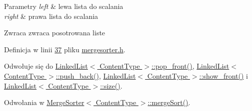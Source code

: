 \begin{DoxyParams}{Parametry}
{\em left} & lewa lista do scalania \\
\hline
{\em right} & prawa lista do scalania \\
\hline
\end{DoxyParams}
\begin{DoxyReturn}{Zwraca}
zwraca posotrowana liste 
\end{DoxyReturn}


Definicja w linii \hyperlink{mergesorter_8h_source_l00037}{37} pliku \hyperlink{mergesorter_8h_source}{mergesorter.\-h}.



Odwołuje się do \hyperlink{linkedlist_8h_source_l00087}{Linked\-List$<$ Content\-Type $>$\-::pop\-\_\-front()}, \hyperlink{linkedlist_8h_source_l00100}{Linked\-List$<$ Content\-Type $>$\-::push\-\_\-back()}, \hyperlink{linkedlist_8h_source_l00127}{Linked\-List$<$ Content\-Type $>$\-::show\-\_\-front()} i \hyperlink{linkedlist_8h_source_l00065}{Linked\-List$<$ Content\-Type $>$\-::size()}.



Odwołania w \hyperlink{mergesorter_8h_source_l00074}{Merge\-Sorter$<$ Content\-Type $>$\-::merge\-Sort()}.


